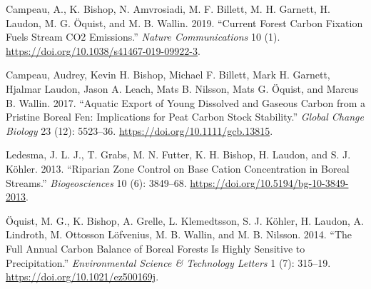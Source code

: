 \documentclass[
]{article}
\newlength{\cslhangindent}
\newenvironment{CSLReferences}[2] %
 {\begin{list}{}{%
  \setlength{\itemindent}{0pt}
  \setlength{\leftmargin}{0pt}
  \setlength{\parsep}{0pt}
  \ifodd #1
   \setlength{\leftmargin}{\cslhangindent}
   \setlength{\itemindent}{-1\cslhangindent}
  \fi
  \setlength{\itemsep}{#2\baselineskip}}}
 {\end{list}}
\begin{document}
\label{refs}
\begin{CSLReferences}{1}{0}
Campeau, A., K. Bishop, N. Amvrosiadi, M. F. Billett, M. H. Garnett, H.
Laudon, M. G. Öquist, and M. B. Wallin. 2019. {``Current Forest Carbon
Fixation Fuels Stream CO2 Emissions.''} \emph{Nature Communications} 10
(1). \url{https://doi.org/10.1038/s41467-019-09922-3}.

Campeau, Audrey, Kevin H. Bishop, Michael F. Billett, Mark H. Garnett,
Hjalmar Laudon, Jason A. Leach, Mats B. Nilsson, Mats G. Öquist, and
Marcus B. Wallin. 2017. {``Aquatic Export of Young Dissolved and Gaseous
Carbon from a Pristine Boreal Fen: Implications for Peat Carbon Stock
Stability.''} \emph{Global Change Biology} 23 (12): 5523--36.
\url{https://doi.org/10.1111/gcb.13815}.

Ledesma, J. L. J., T. Grabs, M. N. Futter, K. H. Bishop, H. Laudon, and
S. J. Köhler. 2013. {``Riparian Zone Control on Base Cation
Concentration in Boreal Streams.''} \emph{Biogeosciences} 10 (6):
3849--68. \url{https://doi.org/10.5194/bg-10-3849-2013}.

Öquist, M. G., K. Bishop, A. Grelle, L. Klemedtsson, S. J. Köhler, H.
Laudon, A. Lindroth, M. Ottosson Löfvenius, M. B. Wallin, and M. B.
Nilsson. 2014. {``The Full Annual Carbon Balance of Boreal Forests Is
Highly Sensitive to Precipitation.''} \emph{Environmental Science \&
Technology Letters} 1 (7): 315--19.
\url{https://doi.org/10.1021/ez500169j}.

\end{CSLReferences}
\end{document}
